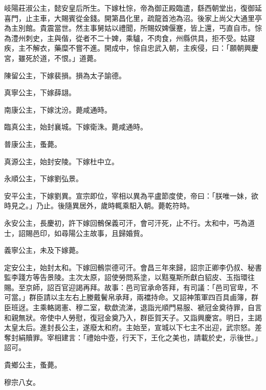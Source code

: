 \begin{pinyinscope}
 岐陽莊淑公主，懿安皇后所生。下嫁杜悰，帝為御正殿臨遣，繇西朝堂出，復御延喜門，止主車，大賜賓從金錢。開第昌化里，疏龍首池為沼。後家上尚父大通里亭為主別館。貴震當世。然主事舅姑以禮聞，所賜奴婢偃蹇，皆上還，丐直自市。悰為澧州刺史，主與偕，從者不二十婢，乘驢，不肉食，州縣供具，拒不受。姑寢疾，主不解衣，藥糜不嘗不進。開成中，悰自忠武入朝，主疾侵，曰：「願朝興慶宮，雖死於道，不恨。」道薨。



 陳留公主，下嫁裴損。損為太子諭德。



 真寧公主，下嫁薛翃。



 南康公主，下嫁沈汾。薨咸通時。



 臨真公主，始封襄城。下嫁衛洙。薨咸通時。



 普康公主，蚤薨。



 真源公主，始封安陵。下嫁杜中立。



 永順公主，下嫁劉弘景。



 安平公主，下嫁劉異。宣宗即位，宰相以異為平盧節度使，帝曰：「朕唯一妹，欲時見之。」乃止。後隨異居外，歲時輒乘馹入朝。薨乾符時。



 永安公主，長慶初，許下嫁回鶻保義可汗，會可汗死，止不行。太和中，丐為道士，詔賜邑印，如尋陽公主故事，且歸婚貲。



 義寧公主，未及下嫁薨。



 定安公主，始封太和。下嫁回鶻崇德可汗。會昌三年來歸，詔宗正卿李仍叔、秘書監李踐方等告景陵。主次太原，詔使勞問系塗，以黠戛斯所獻白貂皮、玉指環往賜。至京師，詔百官迎謁再拜。故事：邑司官承命答拜，有司議：「邑司官卑，不可當。」群臣請以主左右上媵戴鬢帛承拜，兩襠持命。又詔神策軍四百具鹵簿，群臣班迓。主乘輅謁憲、穆二室，欷歔流涕，退詣光順門易服、褫冠金奠待罪，自言和親無狀。帝使中人勞慰，復冠金奠乃入，群臣賀天子。又詣興慶宮。明日，主謁太皇太后。進封長公主，遂廢太和府。主始至，宣城以下七主不出迎，武宗怒。差奪封絹贖罪。宰相建言：「禮始中壺，行天下，王化之美也，請載於史，示後世。」詔可。



 貴鄉公主，蚤薨。



 穆宗八女。




\end{pinyinscope}
